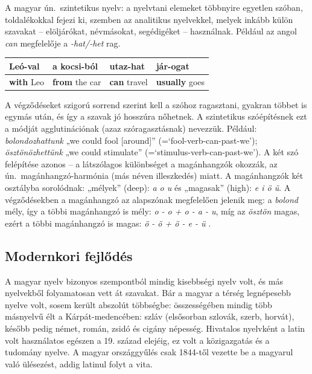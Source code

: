 \begin{multicols}{2}
A magyar ún.\ szintetikus nyelv: a nyelvtani elemeket többnyire egyetlen szóban, toldalékokkal fejezi ki, szemben az analitikus nyelvekkel, melyek inkább külön szavakat -- elöljárókat, névmásokat, segédigéket -- használnak. Például az angol \textit{can} megfelelője a \textit{-hat/-het} rag.

\vspace{3mm} 

\begin{tabular}{l|l|l|l}
    Leó-\textbf{val} & a kocsi-\textbf{ból} & utaz-\textbf{hat} & jár-\textbf{ogat}\\
    \hline
    \textbf{with} Leo & \textbf{from} the car & \textbf{can} travel & \textbf{usually} goes \\
  \end{tabular}

\vspace{3mm} 

A végződéseket szigorú sorrend szerint kell a szóhoz ragasztani, gyakran többet is egymás után, és így a szavak jó hosszúra nőhetnek. A szintetikus szóépítésnek ezt a módját agglutinációnak (azaz szóragasztásnak) nevezzük. Például: \textit{bolondozhattunk} „we could fool [around]” (=`fool-verb-can-past-we'); \textit{ösztönözhettünk} „we could stimulate” (=`stimulus-verb-can-past-we'). A két szó felépítése azonos -- a látszólagos különbséget a magánhangzók okozzák, az ún.\ magánhangzó-harmónia (más néven illeszkedés) miatt. A magánhangzók két osztályba sorolódnak: „mélyek” (deep): \textit{a o u} és „magasak” (high): \textit{e i ö ü}. A végződésekben a magánhangzó az alapszónak megfelelően jelenik meg: a \textit{bolond} mély, így a többi magánhangzó is mély: \textit{o - o + o - a - u}, míg az \textit{ösztön} magas, ezért a többi magánhangzó is magas: \textit{ö - ö + ö - e - ü} \cite{didyouknow1}.

\subsection{Modernkori fejlődés}

A magyar nyelv bizonyos szempontból mindig kisebbségi nyelv volt, és más nyelvekből folyamatosan vett át szavakat. Bár a magyar a térség legnépesebb nyelve volt, sosem került abszolút többségbe: összességében mindig több másnyelvű élt a Kárpát-medencében: szláv (elsősorban szlovák, szerb, horvát), később pedig német, román, zsidó és cigány népesség. Hivatalos nyelvként a latin volt használatos egészen a 19. század elejéig, ez volt a közigazgatás és a tudomány nyelve. A magyar országgyűlés csak 1844-től vezette be a magyarul való ülésezést, addig latinul folyt a vita. 


\end{multicols}
